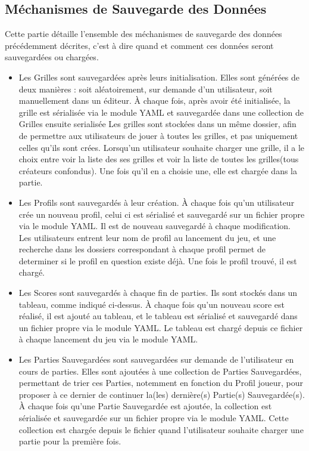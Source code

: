 \documentclass[11pt]{article}
\begin{document}
\subsection{Méchanismes de Sauvegarde des Données}
Cette partie détaille l'ensemble des méchanismes de sauvegarde des données précédemment décrites, c'est à dire quand et comment ces données seront sauvegardées ou chargées.

\begin{itemize}
    \item Les Grilles sont sauvegardées après leurs initialisation. Elles sont générées de deux manières : soit aléatoirement, sur demande d'un utilisateur, soit manuellement dans un éditeur. À chaque fois, après avoir été initialisée, la grille est sérialisée via le module YAML et sauvegardée dans une collection de Grilles ensuite serialisée Les grilles sont stockées dans un même dossier, afin de permettre aux utilisateurs de jouer à toutes les grilles, et pas uniquement celles qu'ils sont crées. Lorsqu'un utilisateur souhaite charger une grille, il a le choix entre voir la liste des ses grilles et voir la liste de toutes les grilles(tous créateurs confondus). Une fois qu'il en a choisie une, elle est chargée dans la partie. %
    \item Les Profils sont sauvegardés à leur création. À chaque fois qu'un utilisateur crée un nouveau profil, celui ci est sérialisé et sauvegardé sur un fichier propre via le module YAML. Il est de nouveau sauvegardé à chaque modification. Les utilisateurs entrent leur nom de profil au lancement du jeu, et une recherche dans les dossiers correspondant à chaque profil permet de determiner si le profil en question existe déjà. Une fois le profil trouvé, il est chargé.
    \item Les Scores sont sauvegardés à chaque fin de parties. Ils sont stockés dans un tableau, comme indiqué ci-dessus. À chaque fois qu'un nouveau score est réalisé, il est ajouté au tableau, et le tableau est sérialisé et sauvegardé dans un fichier propre via le module YAML. Le tableau est chargé depuis ce fichier à chaque lancement du jeu via le module YAML.
    \item Les Parties Sauvegardées sont sauvegardées sur demande de l'utilisateur en cours de parties. Elles sont ajoutées à une collection de Parties Sauvegardées, permettant de trier ces Parties, notemment en fonction du Profil joueur, pour proposer à ce dernier de continuer la(les) dernière(s) Partie(s) Sauvegardée(s). À chaque fois qu'une Partie Sauvegardée est ajoutée, la collection est sérialisée et sauvegardée sur un fichier propre via le module YAML. Cette collection est chargée depuis le fichier quand l'utilisateur souhaite charger une partie pour la première fois.
\end{itemize}
\end{document}
